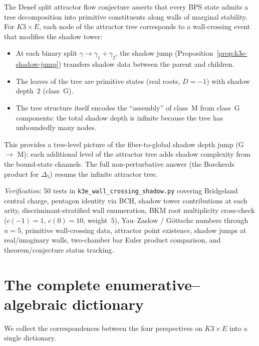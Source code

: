 \begin{remark}
\label{rem:k3e-attractor-shadow}
The Denef split attractor flow conjecture asserts that every BPS state admits a tree decomposition into primitive constituents along walls of marginal stability. For $K3 \times E$, each node of the attractor tree corresponds to a wall-crossing event that modifies the shadow tower:
\begin{itemize}
 \item At each binary split $\gamma \to \gamma_1 + \gamma_2$, the shadow jump (Proposition~\ref{prop:k3e-shadow-jump}) transfers shadow data between the parent and children.
 \item The leaves of the tree are primitive states (real roots, $D = -1$) with shadow depth~$2$ (class~G).
 \item The tree structure itself encodes the ``assembly'' of class~M from class~G components: the total shadow depth is infinite because the tree has unboundedly many nodes.
\end{itemize}
This provides a tree-level picture of the fiber-to-global shadow depth jump (G $\to$ M): each additional level of the attractor tree adds shadow complexity from the bound-state channels. The full non-perturbative answer (the Borcherds product for $\Delta_5$) resums the infinite attractor tree.
\end{remark}

\noindent\textit{Verification}: 50 tests in \texttt{k3e\_wall\_crossing\_shadow.py} covering Bridgeland central charge, pentagon identity via BCH, shadow tower contributions at each arity, discriminant-stratified wall enumeration, BKM root multiplicity cross-check ($c(-1) = 1$, $c(0) = 10$, weight~$5$), Yau--Zaslow / G\"ottsche numbers through $n = 5$, primitive wall-crossing data, attractor point existence, shadow jumps at real/imaginary walls, two-chamber bar Euler product comparison, and theorem/conjecture status tracking.


\section{The complete enumerative--algebraic dictionary}
\label{sec:k3e-dictionary}

We collect the correspondences between the four perspectives on $K3 \times E$ into a single dictionary.

